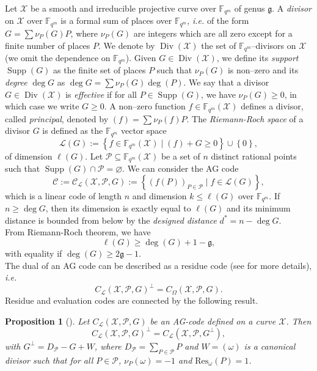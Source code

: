 \documentclass[a4paper]{amsart}
\newtheorem{proposition}[thm]{Proposition}
\theoremstyle{definition}
\theoremstyle{remark}
\newcommand{\calP}{\mathcal{P}}
\newcommand{\calL}{\mathcal{L}}
\newcommand{\calC}{\mathcal{C}}
\newcommand{\calX}{\mathcal{X}}
\newcommand{\fqm}{\mathbb{F}_{q^m}}
\newcommand{\set}[1]{\left\{#1\right\}}
\newcommand{\Supp}{\operatorname{Supp}}
\newcommand{\Div}{\operatorname{Div}}
\begin{document}
Let $\calX$ be a smooth and irreducible projective curve over $\fqm$ of genus $\mathfrak{g}$. A \emph{divisor} on $\calX$ over $\fqm$ is a formal sum of places over $\fqm$, \emph{i.e.} of the form $G=\sum \nu_P(G) P$, where $\nu_P(G)$ are integers which are all zero except for a finite number of places $P$. We denote by $\Div(\calX)$ the set of $\fqm$--divisors on $\calX$ (we omit the dependence on $\fqm$).
Given $G \in \Div(\calX)$, we define its \emph{support} $\Supp(G)$ as the finite set of places $P$ such that $\nu_P(G)$ is non--zero and its \emph{degree} $\deg G$ as $\deg G=\sum \nu_P(G) \deg(P)$. We say that a divisor $G \in \Div(\calX)$ is \emph{effective} if for all $P \in \Supp(G)$, we have $\nu_P(G) \geq 0$, in which case we write $G \geq 0$.
A non--zero function $f \in \fqm(\calX)$ defines a divisor, called \emph{principal}, denoted by $(f)=\sum \nu_P(f) P$. The \emph{Riemann-Roch space} of a divisor $G$ is defined as the $\fqm$ vector space
$$ \calL(G) := \set{f \in \fqm(\calX) \mid (f) + G \geq 0} \cup \set{0},$$
of dimension $\ell(G)$.
Let $\calP \subseteq \fqm(\calX)$ be a set of $n$ distinct rational points such that $\Supp(G) \cap \calP = \varnothing$.
We can consider the AG code 
$$\calC := \calC_{\calL}(\calX,\calP,G) := \set{\left(f(P)\right)_{P \in \calP} \mid f \in \calL(G)},$$
which is a linear code of length $n$ and dimension $k \leq \ell(G)$ over $\fqm$. If $n \geq \deg G$, then its dimension is exactly equal to $\ell(G)$ and its minimum distance is bounded from below by the \emph{designed distance} $d^*=n-\deg G$.\\
From Riemann-Roch theorem, we have
$$ \ell(G) \geq \deg(G) +1 - \mathfrak{g},$$ 
with equality if $\deg(G) \geq 2\mathfrak{g}-1$.\\

The dual of an AG code can be described as a residue code (see \cite{Sti09} for more details), \emph{i.e.}
$$ C_{\calL}(\calX,\calP,G)^{\perp} = C_{\Omega}(\calX,\calP,G).$$ 
Residue and evaluation codes are connected by the following result.

\begin{proposition} [{\cite[Proposition~2.2.10]{Sti09}}] \label{prop:dual_AG_codes}
Let $C_{\calL}(\calX,\calP,G)$ be an AG-code defined on a curve $\calX$. Then 
\[C_{\calL}(\calX,\calP,G)^{\perp} = C_{\calL}(\calX,\calP,G^{\perp}),\]
with $G^{\perp} = D_{\calP}-G+W$, where $D_{\calP} = \sum\limits_{P \in \calP} P$ and $W=(\omega)$ is a canonical divisor such that for all $P \in \calP$, $\nu_P(\omega)=-1$ and $\mathrm{Res}_{\omega}(P)=1$. 
\end{proposition}
\end{document}
